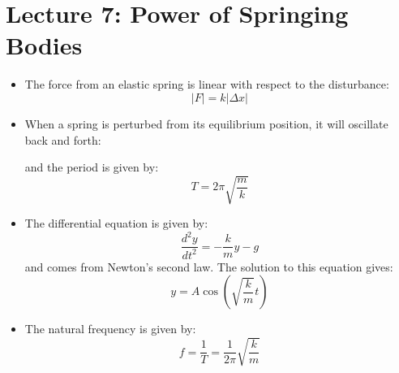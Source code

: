 \section{Lecture 7: Power of Springing Bodies}
\begin{itemize}
    \item The force from an elastic spring is linear with respect to the disturbance:
    \begin{equation}
        |F|=k|\Delta x|
        \label{eq:}
    \end{equation}
    \item When a spring is perturbed from its equilibrium position, it will oscillate back and forth:
    \begin{center}
    \end{center}
    and the period is given by:
    \begin{equation}
        T=2\pi\sqrt{\frac{m}{k}}
        \label{eq:}
    \end{equation}
    \item The differential equation is given by:
    \begin{equation}
        \frac{d^2y}{dt^2} = -\frac{k}{m}y-g
        \label{eq:}
    \end{equation}
    and comes from Newton's second law. The solution to this equation gives:
    \begin{equation}
        y=A\cos\left(\sqrt{\frac{k}{m}}t\right)
        \label{eq:}
    \end{equation}
    \item The natural frequency is given by:
    \begin{equation}
        f=\frac{1}{T}=\frac{1}{2\pi}\sqrt{\frac{k}{m}}
        \label{eq:}
    \end{equation}
    
\end{itemize}
